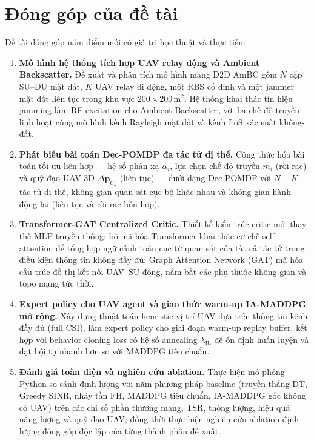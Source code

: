 \section{Đóng góp của đề tài}
\label{sec:intro:contributions}

Đề tài đóng góp năm điểm mới có giá trị học thuật và thực tiễn:

\begin{enumerate}

  \item \textbf{Mô hình hệ thống tích hợp UAV relay động và Ambient Backscatter.}
  Đề xuất và phân tích mô hình mạng D2D AmBC gồm $N$ cặp SU--DU mặt đất, $K$ UAV relay
  di động, một RBS cố định và một jammer mặt đất liên tục trong khu vực $200 \times 200\,$m$^2$.
  Hệ thống khai thác tín hiệu jamming làm RF excitation cho Ambient Backscatter, với ba chế
  độ truyền linh hoạt cùng mô hình kênh Rayleigh mặt đất và kênh LoS xác suất không-đất.

  \item \textbf{Phát biểu bài toán Dec-POMDP đa tác tử dị thể.}
  Công thức hóa bài toán tối ưu liên hợp --- hệ số phản xạ $\alpha_i$, lựa chọn chế độ
  truyền $m_i$ (rời rạc) và quỹ đạo UAV 3D $\Delta\mathbf{p}_{U_k}$ (liên tục) --- dưới
  dạng Dec-POMDP với $N + K$ tác tử dị thể, không gian quan sát cục bộ khác nhau và không
  gian hành động lai (liên tục và rời rạc hỗn hợp).

  \item \textbf{Transformer-GAT Centralized Critic.}
  Thiết kế kiến trúc critic mới thay thế MLP truyền thống: bộ mã hóa Transformer khai thác
  cơ chế self-attention để tổng hợp ngữ cảnh toàn cục từ quan sát của tất cả tác tử trong
  điều kiện thông tin không đầy đủ; Graph Attention Network (GAT) mã hóa cấu trúc đồ thị
  kết nối UAV--SU động, nắm bắt các phụ thuộc không gian và topo mạng tức thời.

  \item \textbf{Expert policy cho UAV agent và giao thức warm-up IA-MADDPG mở rộng.}
  Xây dựng thuật toán heuristic vị trí UAV dựa trên thông tin kênh đầy đủ (full CSI), làm
  expert policy cho giai đoạn warm-up replay buffer, kết hợp với behavior cloning loss có
  hệ số annealing $\lambda_{\mathrm{IL}}$ để ổn định huấn luyện và đạt hội tụ nhanh hơn so
  với MADDPG tiêu chuẩn.

  \item \textbf{Đánh giá toàn diện và nghiên cứu ablation.}
  Thực hiện mô phỏng Python so sánh định lượng với năm phương pháp baseline (truyền thẳng
  DT, Greedy SINR, nhảy tần FH, MADDPG tiêu chuẩn, IA-MADDPG gốc không có UAV) trên các
  chỉ số phần thưởng mạng, TSR, thông lượng, hiệu quả năng lượng và quỹ đạo UAV; đồng thời
  thực hiện nghiên cứu ablation định lượng đóng góp độc lập của từng thành phần đề xuất.

\end{enumerate}

